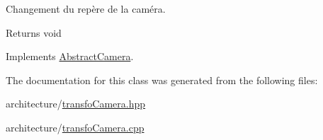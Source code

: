 Changement du repère de la caméra. 

\begin{DoxyReturn}{Returns}
void 
\end{DoxyReturn}


Implements \hyperlink{class_abstract_camera_a4bfcc6ed8980d64cf1d43d7dcb60129b}{Abstract\+Camera}.



The documentation for this class was generated from the following files\+:\begin{DoxyCompactItemize}
\item 
architecture/\hyperlink{transfo_camera_8hpp}{transfo\+Camera.\+hpp}\item 
architecture/\hyperlink{transfo_camera_8cpp}{transfo\+Camera.\+cpp}\end{DoxyCompactItemize}
